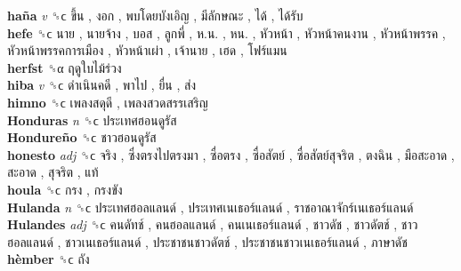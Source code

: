 \textbf{haña} \emph{v}  ␝ϲ   ขึ้น ,  งอก ,  พบโดยบังเอิญ ,  มีลักษณะ ,  ได้ ,  ได้รับ   \\
\textbf{hefe} ␝ϲ   นาย ,  นายจ้าง ,  บอส ,  ลูกพี่ ,  ห.น. ,  หน. ,  หัวหน้า ,  หัวหน้าคนงาน ,  หัวหน้าพรรค ,  หัวหน้าพรรคการเมือง ,  หัวหน้าเผ่า ,  เจ้านาย ,  เฮด ,  โฟร์แมน   \\
\textbf{herfst} ␝α   ฤดูใบไม้ร่วง   \\
\textbf{hiba} \emph{v}  ␝ϲ   ดำเนินคดี ,  พาไป ,  ยื่น ,  ส่ง   \\
\textbf{himno} ␝ϲ   เพลงสดุดี ,  เพลงสวดสรรเสริญ   \\
\textbf{Honduras} \emph{n}  ␝ϲ   ประเทศฮอนดูรัส   \\
\textbf{Hondureño} ␝ϲ   ชาวฮอนดูรัส   \\
\textbf{honesto} \emph{adj}  ␝ϲ   จริง ,  ซึ่งตรงไปตรงมา ,  ซื่อตรง ,  ซื่อสัตย์ ,  ซื่อสัตย์สุจริต ,  ตงฉิน ,  มือสะอาด ,  สะอาด ,  สุจริต ,  แท้   \\
\textbf{houla} ␝ϲ   กรง ,  กรงขัง   \\
\textbf{Hulanda} \emph{n}  ␝ϲ   ประเทศฮอลแลนด์ ,  ประเทศเนเธอร์แลนด์ ,  ราชอาณาจักร์เนเธอร์แลนด์   \\
\textbf{Hulandes} \emph{adj}  ␝ϲ   คนดัทช์ ,  คนฮอลแลนด์ ,  คนเนเธอร์แลนด์ ,  ชาวดัช ,  ชาวดัตช์ ,  ชาวฮอลแลนด์ ,  ชาวเนเธอร์แลนด์ ,  ประชาชนชาวดัตช์ ,  ประชาชนชาวเนเธอร์แลนด์ ,  ภาษาดัช   \\
\textbf{hèmber} ␝ϲ   ถัง   \\
